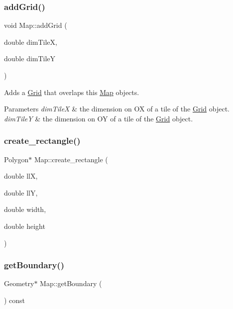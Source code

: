 \subsubsection{\texorpdfstring{add\+Grid()}{addGrid()}}
{\footnotesize\ttfamily void Map\+::add\+Grid (\begin{DoxyParamCaption}\item[{double}]{dim\+TileX,  }\item[{double}]{dim\+TileY }\end{DoxyParamCaption})}

Adds a \hyperlink{class_grid}{Grid} that overlaps this \hyperlink{class_map}{Map} objects. 
\begin{DoxyParams}{Parameters}
{\em dim\+TileX} & the dimension on OX of a tile of the \hyperlink{class_grid}{Grid} object. \\
\hline
{\em dim\+TileY} & the dimension on OY of a tile of the \hyperlink{class_grid}{Grid} object. \\
\hline
\end{DoxyParams}
\mbox{\label{class_map_a36539152d451138361d82469218b4661}} 
\subsubsection{\texorpdfstring{create\+\_\+rectangle()}{create\_rectangle()}}
{\footnotesize\ttfamily Polygon$\ast$ Map\+::create\+\_\+rectangle (\begin{DoxyParamCaption}\item[{double}]{llX,  }\item[{double}]{llY,  }\item[{double}]{width,  }\item[{double}]{height }\end{DoxyParamCaption})\hspace{0.3cm}{\ttfamily [private]}}

\mbox{\label{class_map_a74dd5445ed90bea2a9cc3240bc23f1bc}} 
\subsubsection{\texorpdfstring{get\+Boundary()}{getBoundary()}}
{\footnotesize\ttfamily Geometry$\ast$ Map\+::get\+Boundary (\begin{DoxyParamCaption}{ }\end{DoxyParamCaption}) const}


